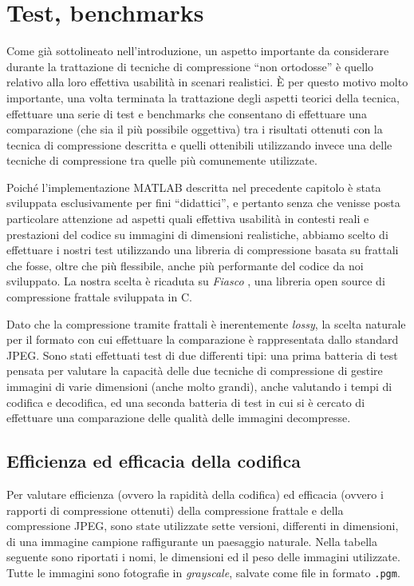 \documentclass[11pt,a4paper,appendixprefix=true,numbers=noenddot]{scrreprt}
\begin{document}
\chapter{Test, benchmarks}

Come già sottolineato nell'introduzione, un aspetto importante da considerare durante la trattazione di tecniche di compressione ``non ortodosse'' è quello relativo alla loro effettiva usabilità in scenari realistici. È per questo motivo molto importante, una volta terminata la trattazione degli aspetti teorici della tecnica, effettuare una serie di test e benchmarks che consentano di effettuare una comparazione (che sia il più possibile oggettiva) tra i risultati ottenuti con la tecnica di compressione descritta e quelli ottenibili utilizzando invece una delle tecniche di compressione tra quelle più comunemente utilizzate.

Poiché l'implementazione MATLAB descritta nel precedente capitolo è stata sviluppata esclusivamente per fini ``didattici'', e pertanto senza che venisse posta particolare attenzione ad aspetti quali effettiva usabilità in contesti reali e prestazioni del codice su immagini di dimensioni realistiche, abbiamo scelto di effettuare i nostri test utilizzando una libreria di compressione basata su frattali che fosse, oltre che più flessibile, anche più performante del codice da noi sviluppato. La nostra scelta è ricaduta su \emph{Fiasco} \cite{fiasco} \cite{IEEE} \cite{ULL}, una libreria open source di compressione frattale sviluppata in C.

Dato che la compressione tramite frattali è inerentemente \emph{lossy}, la scelta naturale per il formato con cui effettuare la comparazione è rappresentata dallo standard JPEG\cite{jpeg}. Sono stati effettuati test di due differenti tipi: una prima batteria di test pensata per valutare la capacità delle due tecniche di compressione di gestire immagini di varie dimensioni (anche molto grandi), anche valutando i tempi di codifica e decodifica, ed una seconda batteria di test in cui si è cercato di effettuare una comparazione  delle qualità delle immagini decompresse. 

\section{ Efficienza ed efficacia della codifica }

Per valutare efficienza (ovvero la rapidità della codifica) ed efficacia (ovvero i rapporti di compressione ottenuti) della compressione frattale e della compressione JPEG, sono state utilizzate sette versioni, differenti in dimensioni, di una immagine campione raffigurante un paesaggio naturale. Nella tabella seguente sono riportati i nomi, le dimensioni ed il peso delle immagini utilizzate. Tutte le immagini sono fotografie in \emph{grayscale}, salvate come file in formato \texttt{.pgm}.
\end{document}
